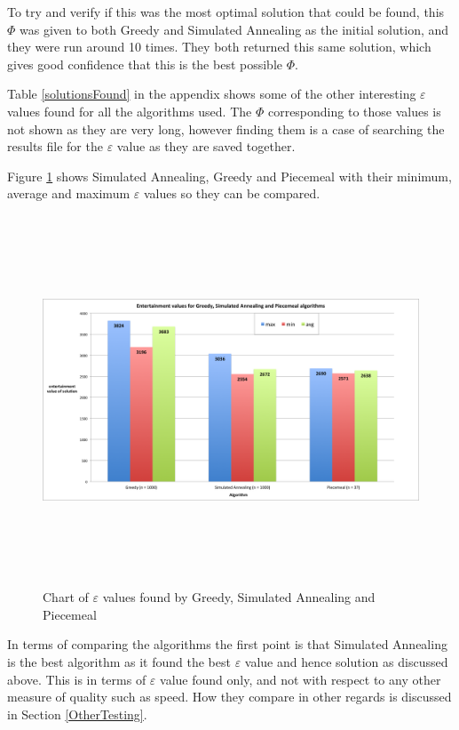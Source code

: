 \documentclass[12pt]{report}
\begin{document}
To try and verify if this was the most optimal solution that could be found, this $\Phi$ was given to both Greedy and Simulated Annealing as the initial solution, and they were run around 10 times. They both returned this same solution, which gives good confidence that this is the best possible $\Phi$.

Table \ref{solutionsFound} in the appendix shows some of the other interesting $\varepsilon$ values found for all the algorithms used. The $\Phi$ corresponding to those values is not shown as they are very long, however finding them is a case of searching the results file for the $\varepsilon$ value as they are saved together.

Figure \ref{eScreenshot} shows Simulated Annealing, Greedy and Piecemeal with their minimum, average and maximum $\varepsilon$ values so they can be compared.

\begin{figure}[H]
\centering
\includegraphics[width=18cm, height=11cm]{./entertainmentValues}
\caption{Chart of $\varepsilon$ values found by Greedy, Simulated Annealing and Piecemeal}
\label{eScreenshot}
\end{figure}

In terms of comparing the algorithms the first point is that Simulated Annealing is the best algorithm as it found the best $\varepsilon$ value and hence solution as discussed above. This is in terms of $\varepsilon$ value found only, and not with respect to any other measure of quality such as speed. How they compare in other regards is discussed in Section \ref{OtherTesting}.
\end{document}
